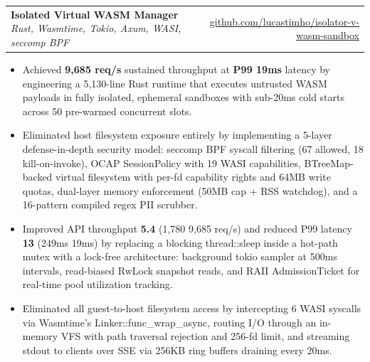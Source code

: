 \documentclass[10pt, a4paper]{article}
\makeatletter
\newcommand{\resumeItem}[1]{
  \item\small{
    {#1}
  }
}
\newcommand{\resumeProjectHeading}[2]{
    \item
    \begin{tabularx}{\linewidth}{@{}X r@{}}
      \small#1 & \small#2 \\
    \end{tabularx}\vspace{-2pt}
}
\newcommand{\resumeItemListStart}{\begin{itemize}[nosep, topsep=1pt, leftmargin=0.15in]}
\newcommand{\resumeItemListEnd}{\end{itemize}\vspace{-4pt}}
\makeatother
\begin{document}
      \resumeProjectHeading
          {\textbf{Isolated Virtual WASM Manager} \textbar{} \emph{Rust, Wasmtime, Tokio, Axum, WASI, seccomp BPF}}{\small\href{https://github.com/lucastimho/isolator-v-wasm-sandbox}{github.com/lucastimho/isolator-v-wasm-sandbox}}
          \resumeItemListStart
            \resumeItem{Achieved \textbf{9,685 req/s} sustained throughput at \textbf{P99 19ms} latency by engineering a 5,130-line Rust runtime that executes untrusted WASM payloads in fully isolated, ephemeral sandboxes with sub-20ms cold starts across 50 pre-warmed concurrent slots.}
            \resumeItem{Eliminated host filesystem exposure entirely by implementing a 5-layer defense-in-depth security model: seccomp BPF syscall filtering (67 allowed, 18 kill-on-invoke), OCAP SessionPolicy with 19 WASI capabilities, BTreeMap-backed virtual filesystem with per-fd capability rights and 64MB write quotas, dual-layer memory enforcement (50MB cap + RSS watchdog), and a 16-pattern compiled regex PII scrubber.}
            \resumeItem{Improved API throughput \textbf{5.4\texttimes{}} (1,780 \textrightarrow{} 9,685 req/s) and reduced P99 latency \textbf{13\texttimes{}} (249ms \textrightarrow{} 19ms) by replacing a blocking thread::sleep inside a hot-path mutex with a lock-free architecture: background tokio sampler at 500ms intervals, read-biased RwLock snapshot reads, and RAII AdmissionTicket for real-time pool utilization tracking.}
            \resumeItem{Eliminated all guest-to-host filesystem access by intercepting 6 WASI syscalls via Wasmtime's Linker::func\_wrap\_async, routing I/O through an in-memory VFS with path traversal rejection and 256-fd limit, and streaming stdout to clients over SSE via 256KB ring buffers draining every 20ms.}
          \resumeItemListEnd
\end{document}
